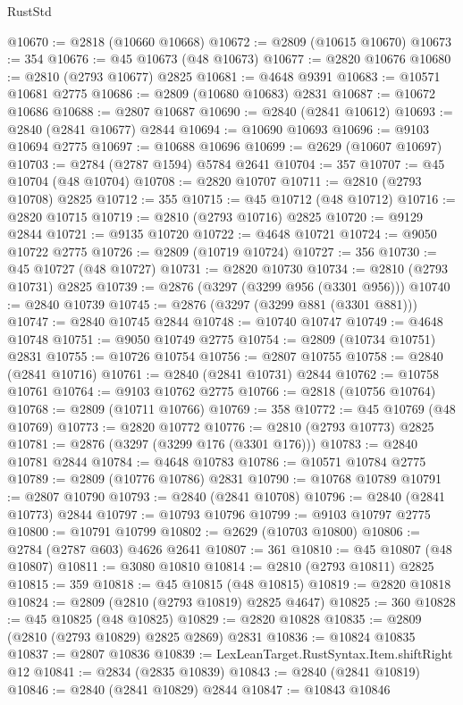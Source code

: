 \begin{lexlean}{RustStd}
\begin{coremodule}
@10670 := @2818 (@10660 @10668)
@10672 := @2809 (@10615 @10670)
@10673 := 354
@10676 := @45 @10673 (@48 @10673)
@10677 := @2820 @10676
@10680 := @2810 (@2793 @10677) @2825
@10681 := @4648 @9391
@10683 := @10571 @10681 @2775
@10686 := @2809 (@10680 @10683) @2831
@10687 := @10672 @10686
@10688 := @2807 @10687
@10690 := @2840 (@2841 @10612)
@10693 := @2840 (@2841 @10677) @2844
@10694 := @10690 @10693
@10696 := @9103 @10694 @2775
@10697 := @10688 @10696
@10699 := @2629 (@10607 @10697)
@10703 := @2784 (@2787 @1594) @5784 @2641
@10704 := 357
@10707 := @45 @10704 (@48 @10704)
@10708 := @2820 @10707
@10711 := @2810 (@2793 @10708) @2825
@10712 := 355
@10715 := @45 @10712 (@48 @10712)
@10716 := @2820 @10715
@10719 := @2810 (@2793 @10716) @2825
@10720 := @9129 @2844
@10721 := @9135 @10720
@10722 := @4648 @10721
@10724 := @9050 @10722 @2775
@10726 := @2809 (@10719 @10724)
@10727 := 356
@10730 := @45 @10727 (@48 @10727)
@10731 := @2820 @10730
@10734 := @2810 (@2793 @10731) @2825
@10739 := @2876 (@3297 (@3299 @956 (@3301 @956)))
@10740 := @2840 @10739
@10745 := @2876 (@3297 (@3299 @881 (@3301 @881)))
@10747 := @2840 @10745 @2844
@10748 := @10740 @10747
@10749 := @4648 @10748
@10751 := @9050 @10749 @2775
@10754 := @2809 (@10734 @10751) @2831
@10755 := @10726 @10754
@10756 := @2807 @10755
@10758 := @2840 (@2841 @10716)
@10761 := @2840 (@2841 @10731) @2844
@10762 := @10758 @10761
@10764 := @9103 @10762 @2775
@10766 := @2818 (@10756 @10764)
@10768 := @2809 (@10711 @10766)
@10769 := 358
@10772 := @45 @10769 (@48 @10769)
@10773 := @2820 @10772
@10776 := @2810 (@2793 @10773) @2825
@10781 := @2876 (@3297 (@3299 @176 (@3301 @176)))
@10783 := @2840 @10781 @2844
@10784 := @4648 @10783
@10786 := @10571 @10784 @2775
@10789 := @2809 (@10776 @10786) @2831
@10790 := @10768 @10789
@10791 := @2807 @10790
@10793 := @2840 (@2841 @10708)
@10796 := @2840 (@2841 @10773) @2844
@10797 := @10793 @10796
@10799 := @9103 @10797 @2775
@10800 := @10791 @10799
@10802 := @2629 (@10703 @10800)
@10806 := @2784 (@2787 @603) @4626 @2641
@10807 := 361
@10810 := @45 @10807 (@48 @10807)
@10811 := @3080 @10810
@10814 := @2810 (@2793 @10811) @2825
@10815 := 359
@10818 := @45 @10815 (@48 @10815)
@10819 := @2820 @10818
@10824 := @2809 (@2810 (@2793 @10819) @2825 @4647)
@10825 := 360
@10828 := @45 @10825 (@48 @10825)
@10829 := @2820 @10828
@10835 := @2809 (@2810 (@2793 @10829) @2825 @2869) @2831
@10836 := @10824 @10835
@10837 := @2807 @10836
@10839 := LexLeanTarget.RustSyntax.Item.shiftRight @12
@10841 := @2834 (@2835 @10839)
@10843 := @2840 (@2841 @10819)
@10846 := @2840 (@2841 @10829) @2844
@10847 := @10843 @10846

\end{coremodule}
\end{lexlean}
